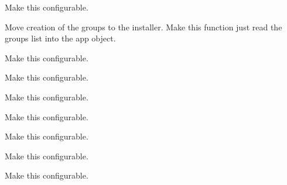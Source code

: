 \begin{DoxyRefList}
\item[\label{todo__todo000034}%
\hypertarget{todo__todo000034}{}%
Global \hyperlink{event_loop_8c_a420b6126203dae423f97289aa242afbf}{Create\+Event} (const char $\ast$name, size\+\_\+t payload\+Size, bool is\+Ref\+Counted)]Make this configurable.  
\item[\label{todo__todo000009}%
\hypertarget{todo__todo000009}{}%
Global \hyperlink{supervisor_2app_8c_a82c0e5167d8411b8bc63da9bd23ef18a}{Create\+Supplementary\+Groups} (app\+\_\+\+Ref\+\_\+t app\+Ref)]Move creation of the groups to the installer. Make this function just read the groups list into the app object.  
\item[\label{todo__todo000033}%
\hypertarget{todo__todo000033}{}%
Global \hyperlink{event_loop_8c_ac3d6efcf53ecee3acba66177ce2d7340}{D\+E\+F\+A\+U\+L\+T\+\_\+\+E\+V\+E\+N\+T\+\_\+\+P\+O\+O\+L\+\_\+\+S\+I\+ZE} ]Make this configurable.  
\item[\label{todo__todo000039}%
\hypertarget{todo__todo000039}{}%
Global \hyperlink{fd_monitor_8c_ac19d988964dd22cd571d09dde4a2b5ae}{D\+E\+F\+A\+U\+L\+T\+\_\+\+F\+D\+\_\+\+M\+O\+N\+I\+T\+O\+R\+\_\+\+P\+O\+O\+L\+\_\+\+S\+I\+ZE} ]Make this configurable.  
\item[\label{todo__todo000032}%
\hypertarget{todo__todo000032}{}%
Global \hyperlink{event_loop_8c_ac5d13db8d6554c3f06eef4f1e3871e8b}{D\+E\+F\+A\+U\+L\+T\+\_\+\+H\+A\+N\+D\+L\+E\+R\+\_\+\+P\+O\+O\+L\+\_\+\+S\+I\+ZE} ]Make this configurable.  
\item[\label{todo__todo000051}%
\hypertarget{todo__todo000051}{}%
Global \hyperlink{safe_ref_8c_a2b3956490cad51b02c75a52f67e8d9df}{D\+E\+F\+A\+U\+L\+T\+\_\+\+M\+A\+P\+\_\+\+P\+O\+O\+L\+\_\+\+S\+I\+ZE} ]Make this configurable.  
\item[\label{todo__todo000030}%
\hypertarget{todo__todo000030}{}%
Global \hyperlink{event_loop_8c_a56b1dafb589cb517c72e928a91456f9d}{D\+E\+F\+A\+U\+L\+T\+\_\+\+Q\+U\+E\+U\+E\+D\+\_\+\+F\+U\+N\+C\+T\+I\+O\+N\+\_\+\+P\+O\+O\+L\+\_\+\+S\+I\+ZE} ]Make this configurable.  
\item[\label{todo__todo000031}%
\hypertarget{todo__todo000031}{}%
Global \hyperlink{event_loop_8c_a94a9c4d23e95d17f4a8efbdab735ba22}{D\+E\+F\+A\+U\+L\+T\+\_\+\+R\+E\+P\+O\+R\+T\+\_\+\+P\+O\+O\+L\+\_\+\+S\+I\+ZE} ]Make this configurable.  
\item[\label{todo__todo000045}%
\hypertarget{todo__todo000045}{}%
Global \hyperlink{mem_8c_a0bccc174e7790dec3a9a397acb57551c}{D\+E\+F\+A\+U\+L\+T\+\_\+\+S\+U\+B\+\_\+\+P\+O\+O\+L\+S\+\_\+\+P\+O\+O\+L\+\_\+\+S\+I\+ZE} ]Make this configurable.  

\end{DoxyRefList}
